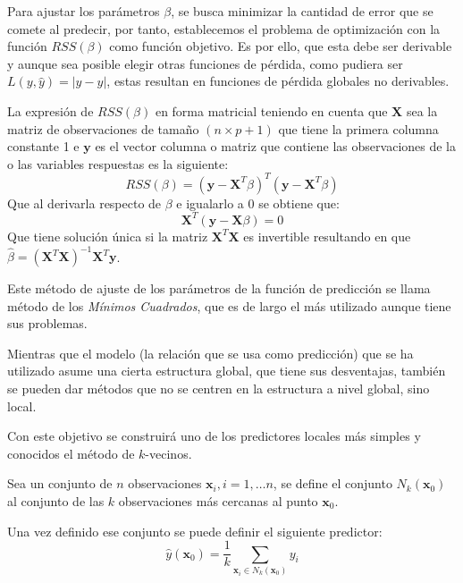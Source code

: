 \noindent Para ajustar los parámetros $\beta$, se busca minimizar la cantidad de error que se comete al predecir, por tanto, establecemos el problema de optimización con la función $RSS(\beta)$ como función objetivo. Es por ello, que esta debe ser derivable y aunque sea posible elegir otras funciones de pérdida, como pudiera ser $L(y,\hat{y})=\vert y-\hat{y}\vert$, estas resultan en funciones de pérdida globales no derivables. 

\noindent La expresión de $RSS(\beta)$ en forma matricial teniendo en cuenta que $\textbf{X}$ sea la matriz de observaciones de tamaño $(n\times p+1)$ que tiene la primera columna constante 1 e $\textbf{y}$ es el vector columna o matriz que contiene las observaciones de la o las variables respuestas es la siguiente: 
\begin{equation}
RSS(\beta)=(\textbf{y}-\textbf{X}^T\beta)^T(\textbf{y}-\textbf{X}^T\beta)
\end{equation}
Que al derivarla respecto de $\beta$ e igualarlo a $0$ se obtiene que:
\begin{equation}
\textbf{X}^T(\textbf{y}-\textbf{X}\beta)=0
\end{equation}
Que tiene solución única si la matriz $\textbf{X}^T\textbf{X}$ es invertible resultando en que $\hat{\beta}=(\textbf{X}^T\textbf{X})^{-1}\textbf{X}^T\textbf{y}$.

\noindent Este método de ajuste de los parámetros de la función de predicción se llama método de los \textit{Mínimos Cuadrados}, que es de largo el más utilizado aunque tiene sus problemas. 

\noindent Mientras que el modelo (la relación que se usa como predicción) que se ha utilizado asume una cierta estructura global, que tiene sus desventajas, también se pueden dar métodos que no se centren en la estructura a nivel global, sino local. 

\noindent Con este objetivo se construirá uno de los predictores locales más simples y conocidos el método de $k$-vecinos. 

\begin{defi}
Sea un conjunto de $n$ observaciones $\textbf{x}_i, i =1,\ldots n$, se define el conjunto $N_k(\textbf{x}_0)$ al conjunto de las $k$ observaciones más cercanas al punto $\textbf{x}_0$.
\end{defi}

\noindent Una vez definido ese conjunto se puede definir el siguiente predictor: 
\begin{equation}
\hat{y}(\textbf{x}_0)=\dfrac{1}{k}\sum_{\textbf{x}_i\in N_k(\textbf{x}_0)}y_i
\end{equation}

